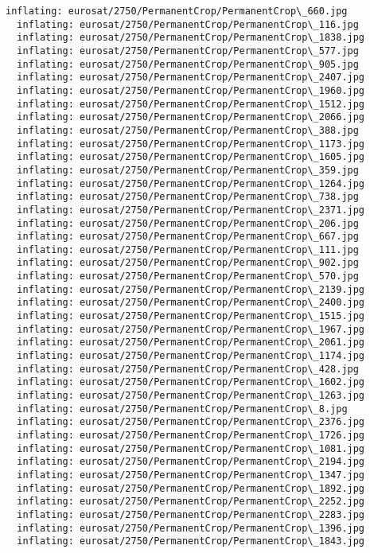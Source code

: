 \documentclass[11pt]{article}
\begin{document}
\begin{Verbatim}[commandchars=\\\{\}]
  inflating: eurosat/2750/PermanentCrop/PermanentCrop\_660.jpg
  inflating: eurosat/2750/PermanentCrop/PermanentCrop\_116.jpg
  inflating: eurosat/2750/PermanentCrop/PermanentCrop\_1838.jpg
  inflating: eurosat/2750/PermanentCrop/PermanentCrop\_577.jpg
  inflating: eurosat/2750/PermanentCrop/PermanentCrop\_905.jpg
  inflating: eurosat/2750/PermanentCrop/PermanentCrop\_2407.jpg
  inflating: eurosat/2750/PermanentCrop/PermanentCrop\_1960.jpg
  inflating: eurosat/2750/PermanentCrop/PermanentCrop\_1512.jpg
  inflating: eurosat/2750/PermanentCrop/PermanentCrop\_2066.jpg
  inflating: eurosat/2750/PermanentCrop/PermanentCrop\_388.jpg
  inflating: eurosat/2750/PermanentCrop/PermanentCrop\_1173.jpg
  inflating: eurosat/2750/PermanentCrop/PermanentCrop\_1605.jpg
  inflating: eurosat/2750/PermanentCrop/PermanentCrop\_359.jpg
  inflating: eurosat/2750/PermanentCrop/PermanentCrop\_1264.jpg
  inflating: eurosat/2750/PermanentCrop/PermanentCrop\_738.jpg
  inflating: eurosat/2750/PermanentCrop/PermanentCrop\_2371.jpg
  inflating: eurosat/2750/PermanentCrop/PermanentCrop\_206.jpg
  inflating: eurosat/2750/PermanentCrop/PermanentCrop\_667.jpg
  inflating: eurosat/2750/PermanentCrop/PermanentCrop\_111.jpg
  inflating: eurosat/2750/PermanentCrop/PermanentCrop\_902.jpg
  inflating: eurosat/2750/PermanentCrop/PermanentCrop\_570.jpg
  inflating: eurosat/2750/PermanentCrop/PermanentCrop\_2139.jpg
  inflating: eurosat/2750/PermanentCrop/PermanentCrop\_2400.jpg
  inflating: eurosat/2750/PermanentCrop/PermanentCrop\_1515.jpg
  inflating: eurosat/2750/PermanentCrop/PermanentCrop\_1967.jpg
  inflating: eurosat/2750/PermanentCrop/PermanentCrop\_2061.jpg
  inflating: eurosat/2750/PermanentCrop/PermanentCrop\_1174.jpg
  inflating: eurosat/2750/PermanentCrop/PermanentCrop\_428.jpg
  inflating: eurosat/2750/PermanentCrop/PermanentCrop\_1602.jpg
  inflating: eurosat/2750/PermanentCrop/PermanentCrop\_1263.jpg
  inflating: eurosat/2750/PermanentCrop/PermanentCrop\_8.jpg
  inflating: eurosat/2750/PermanentCrop/PermanentCrop\_2376.jpg
  inflating: eurosat/2750/PermanentCrop/PermanentCrop\_1726.jpg
  inflating: eurosat/2750/PermanentCrop/PermanentCrop\_1081.jpg
  inflating: eurosat/2750/PermanentCrop/PermanentCrop\_2194.jpg
  inflating: eurosat/2750/PermanentCrop/PermanentCrop\_1347.jpg
  inflating: eurosat/2750/PermanentCrop/PermanentCrop\_1892.jpg
  inflating: eurosat/2750/PermanentCrop/PermanentCrop\_2252.jpg
  inflating: eurosat/2750/PermanentCrop/PermanentCrop\_2283.jpg
  inflating: eurosat/2750/PermanentCrop/PermanentCrop\_1396.jpg
  inflating: eurosat/2750/PermanentCrop/PermanentCrop\_1843.jpg

\end{Verbatim}
\end{document}
